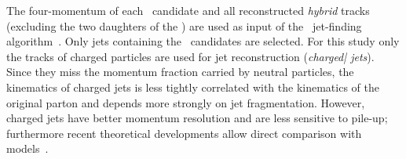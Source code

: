 \documentclass[a4paper]{jpconf}
\begin{document}
The four-momentum of each \Dzero\ candidate and all reconstructed \emph{hybrid} tracks
(excluding the two daughters of the \Dzero) are used as input of the \antikt\ jet-finding algorithm~\cite{Cacciari:2008c}.
Only jets containing the \Dzero\ candidates are selected.
For this study only the tracks of charged particles are used for jet reconstruction (\emph{charged| jets}). Since they miss the momentum
fraction carried by neutral particles, the kinematics of charged jets is less tightly correlated with the kinematics
of the original parton and depends more strongly on jet fragmentation. However, charged jets have better momentum resolution
and are less sensitive to pile-up; furthermore recent theoretical developments allow direct comparison with models~\cite{Thaler:2013}.
\end{document}
